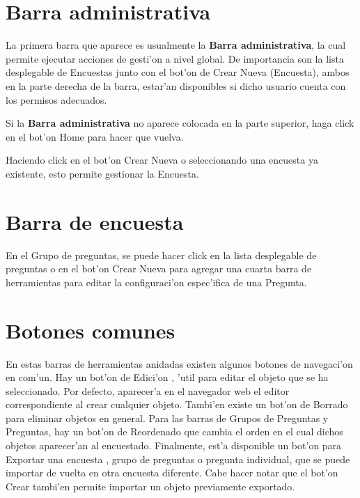\documentclass[12pt,spanish]{report}
\begin{document}
\section{Barra administrativa}
La primera barra que aparece es usualmente la {\bf Barra administrativa}, la cual permite ejecutar acciones de gesti'on a nivel global. De importancia son la lista desplegable de Encuestas junto con el bot'on de Crear Nueva (Encuesta), ambos en la parte derecha de la barra, estar'an disponibles si dicho usuario cuenta con los permisos adecuados.\\
\par
\centerline{\hbox{}}
\par


Si la {\bf Barra administrativa} no aparece colocada en la parte superior, haga click en el bot'on Home  \hbox{} para hacer que vuelva. 


Haciendo click en el bot'on Crear Nueva \hbox{}  o seleccionando una encuesta ya existente, esto permite gestionar la Encuesta.

\newpage

\section{Barra de encuesta}
En el Grupo de preguntas, se puede hacer click en la lista desplegable de preguntas o en el bot'on Crear Nueva \hbox{}   para agregar una cuarta barra de herramientas para editar la configuraci'on espec'ifica de una Pregunta.\\
\par
\centerline{\hbox{}}
\par

\section{Botones comunes}

En estas barras de herramientas anidadas existen algunos botones de navegaci'on en com'un. Hay un bot'on de Edici'on \hbox{}, 'util para editar el objeto que se ha seleccionado. Por defecto, aparecer'a en el navegador web el editor correspondiente al crear cualquier objeto. Tambi'en existe un bot'on de Borrado   \hbox{} para eliminar objetos en general. 
Para las barras de Grupos de Preguntas y Preguntas, hay un bot'on de Reordenado   \hbox{}  que cambia el orden en el cual dichos objetos aparecer'an al encuestado. 
Finalmente, est'a disponible un bot'on para Exportar  una encuesta   \hbox{},  grupo de preguntas o pregunta individual, que se puede importar de vuelta en otra encuesta diferente. Cabe hacer notar que el bot'on Crear  tambi'en permite importar un objeto previamente exportado.
\end{document}
